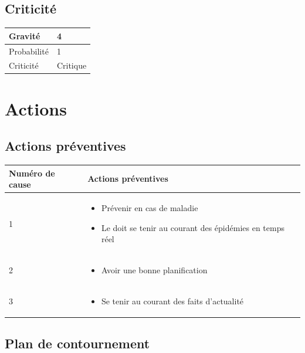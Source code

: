 \subsection*{Criticité}

\begin{table}[h]
\centering
	\begin{tabularx}{12.8cm}{|>{}X|X|}
	\hline
	Gravité & 4\\
	\hline
	Probabilité & 1\\
	\hline
	Criticité & Critique\\
	\hline
	\end{tabularx}
\end{table}
\newpage

\section*{Actions}
\subsection*{Actions préventives}

\centering
	\begin{longtable}{|p{7cm}|p{7cm}|}
	\hline
	\rowcolor{gray!40} Numéro de cause & Actions préventives \\
	\hline
	 1 & \begin{itemize}
	 	\item Prévenir en cas de maladie
	 	\item Le \CP{} doit se tenir au courant des épidémies en temps réel
	 \end{itemize} \\

	\hline
	2 & \begin{itemize}
		\item Avoir une bonne planification
	\end{itemize} \\
	\hline
	3 & \begin{itemize}
		\item Se tenir au courant des faits d'actualité
	\end{itemize} \\
	\hline
	\end{longtable}

\flushleft
\subsection*{Plan de contournement}

